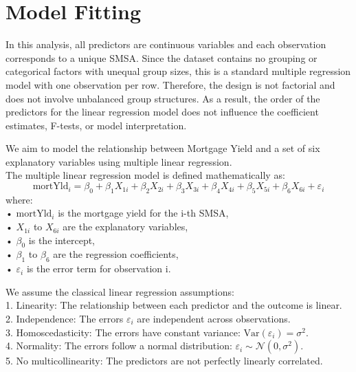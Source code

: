 \documentclass[
  12pt,
]{article}
\begin{document}
\vspace{-1em}

\section{Model Fitting}\label{model-fitting}

In this analysis, all predictors are continuous variables and each
observation corresponds to a unique SMSA. Since the dataset contains no
grouping or categorical factors with unequal group sizes, this is a
standard multiple regression model with one observation per row.
Therefore, the design is not factorial and does not involve unbalanced
group structures. As a result, the order of the predictors for the
linear regression model does not influence the coefficient estimates,
F-tests, or model interpretation.

We aim to model the relationship between Mortgage Yield and a set of six
explanatory variables using multiple linear regression.\\
The multiple linear regression model is defined mathematically as:
\vspace{-0.2cm} \[
\text{mortYld}_i = \beta_0 + \beta_1 X_{1i} + \beta_2 X_{2i} + \beta_3 X_{3i} + \beta_4 X_{4i} + \beta_5 X_{5i} + \beta_6 X_{6i} + \varepsilon_i
\] where:\\
• \(\text{mortYld}_i\) is the mortgage yield for the i-th SMSA,\\
• \(X_{1i}\) to \(X_{6i}\) are the explanatory variables,\\
• \(\beta_0\) is the intercept,\\
• \(\beta_1\) to \(\beta_6\) are the regression coefficients,\\
• \(\varepsilon_i\) is the error term for observation i.

\vspace{0.2cm}

We assume the classical linear regression assumptions:\\
1. Linearity: The relationship between each predictor and the outcome is
linear.\\
2. Independence: The errors \(\varepsilon_i\) are independent across
observations.\\
3. Homoscedasticity: The errors have constant variance:
\(\text{Var}(\varepsilon_i) = \sigma^2\).\\
4. Normality: The errors follow a normal distribution:
\(\varepsilon_i \sim \mathcal{N}(0, \sigma^2)\).\\
5. No multicollinearity: The predictors are not perfectly linearly
correlated.
\end{document}
